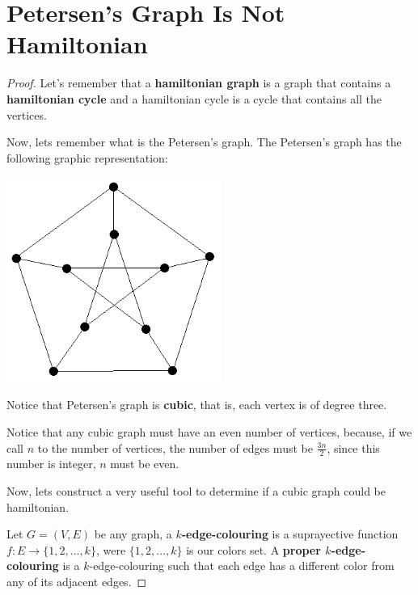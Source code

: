 ﻿\chapter{Petersen's Graph Is Not Hamiltonian}

    
    \begin{proof}
        Let's remember that a \textbf{hamiltonian graph} is a graph that contains a \textbf{hamiltonian cycle} and a hamiltonian cycle is
        a cycle that contains all the vertices.\pn
        
        Now, lets remember what is the Petersen's graph. The Petersen's graph has the following graphic representation:
        \begin{center}
            \includegraphics[width=7cm]{PetersenIsNotHamiltonian/Petersen1.png}    
        \end{center}\pn
        
        Notice that Petersen's graph is \textbf{cubic}, that is, each vertex is of degree three.\pn 

        Notice that any cubic graph must have an even number of vertices, because, if we call $n$ to the number of vertices, 
        the number of edges must be $\frac{3n}{2}$, since this number is integer, $n$ must be even.\pn
        
        Now, lets construct a very useful tool to determine if a cubic graph could be hamiltonian.\pn 
        
        Let $G = (V, E)$ be any graph, a \textbf{$k$-edge-colouring} is a suprayective function $f : E \longrightarrow \{1, 2, \dots, k\}$, 
        were $\{1, 2, \dots, k\}$ is our colors set. A \textbf{proper $k$-edge-colouring} is a $k$-edge-colouring such that each edge has a 
        different color from any of its adjacent edges.\pn
               

\end{proof}
